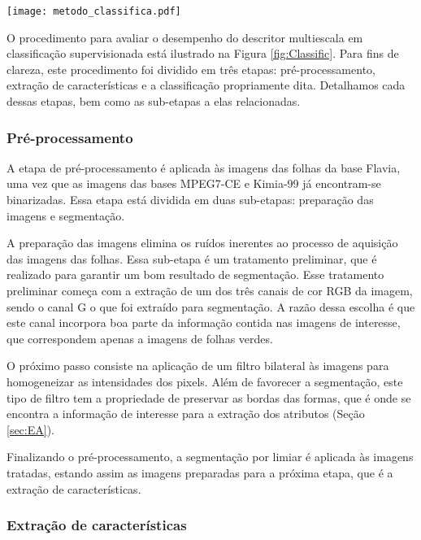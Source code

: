 \begin{figure*}[b]
\caption{\label{fig:Classific}
Metodologia de classificação para avaliação de desempenho do descritor otimizado pelo método proposto exibido na Figura.  \ref{fig:Avaliacao}} 
\centering
\texttt{[image: metodo\_classifica.pdf]}
\end{figure*}

O procedimento para avaliar o desempenho do descritor multiescala em classificação supervisionada está ilustrado na Figura \ref{fig:Classific}. Para fins de clareza, este procedimento foi dividido em três etapas: pré-processamento, extração de características e a classificação propriamente dita. Detalhamos cada dessas etapas, bem como as sub-etapas a elas relacionadas.

\subsubsection*{Pré-processamento}

A etapa de pré-processamento é aplicada às imagens das folhas da base Flavia, uma vez que as imagens das bases MPEG7-CE e Kimia-99 já encontram-se binarizadas. Essa etapa está dividida em duas sub-etapas: preparação das imagens e segmentação. 

A preparação das imagens elimina os ruídos inerentes ao processo de aquisição das imagens das folhas. Essa sub-etapa é um tratamento preliminar, que é realizado para garantir um bom resultado de segmentação. Esse tratamento preliminar começa com a extração de um dos três canais de cor RGB da imagem, sendo o canal G o que foi extraído para segmentação. A razão dessa escolha é que este canal incorpora boa parte da informação contida nas imagens de interesse, que correspondem apenas a imagens de folhas verdes. 

O próximo passo consiste na aplicação de um filtro bilateral \cite{Gonzalez:2006} às imagens para homogeneizar as intensidades dos pixels.  Além de favorecer a segmentação, este tipo de filtro tem a propriedade de preservar as bordas das formas, que é onde se encontra a informação de interesse para a extração dos atributos (Seção \ref{sec:EA}). 

Finalizando o pré-processamento, a segmentação por limiar \cite{Gonzalez:2006} é aplicada às imagens tratadas, estando assim as imagens preparadas para a próxima etapa, que é a extração de características.

\subsubsection*{Extração de características}

